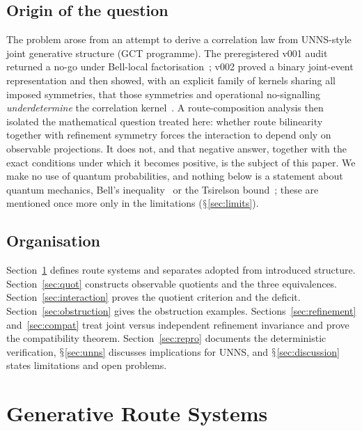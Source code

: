 \documentclass[11pt,a4paper]{article}
\renewcommand{\S}{\ensuremath{\mathsection}}
\theoremstyle{plain}
\theoremstyle{definition}
\begin{document}
\subsection{Origin of the question}
The problem arose from an attempt to derive a correlation law from UNNS-style joint generative structure (GCT programme).
The preregistered v001 audit returned a no-go under Bell-local factorisation~\cite{G1,G6}; v002 proved a binary joint-event representation and then showed, with an explicit family of kernels sharing all imposed symmetries, that those symmetries and operational no-signalling \emph{underdetermine} the correlation kernel~\cite{G2,G4}.
A route-composition analysis then isolated the mathematical question treated here: whether route bilinearity together with refinement symmetry forces the interaction to depend only on observable projections.
It does not, and that negative answer, together with the exact conditions under which it becomes positive, is the subject of this paper.
We make no use of quantum probabilities, and nothing below is a statement about quantum mechanics, Bell's inequality~\cite{Bel64,CHSH69} or the Tsirelson bound~\cite{Tsi80}; these are mentioned once more only in the limitations (\S\ref{sec:limits}).

\subsection{Organisation}
Section~\ref{sec:routes} defines route systems and separates adopted from introduced structure.
Section~\ref{sec:quot} constructs observable quotients and the three equivalences.
Section~\ref{sec:interaction} proves the quotient criterion and the deficit.
Section~\ref{sec:obstruction} gives the obstruction examples.
Sections~\ref{sec:refinement} and~\ref{sec:compat} treat joint versus independent refinement invariance and prove the compatibility theorem.
Section~\ref{sec:repro} documents the deterministic verification, \S\ref{sec:unns} discusses implications for UNNS, and \S\ref{sec:discussion} states limitations and open problems.

\section{Generative Route Systems}\label{sec:routes}
\end{document}
